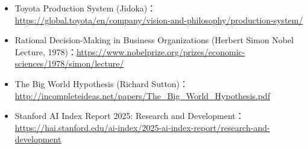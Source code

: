 \documentclass[UTF8,a4paper,11pt,fontset=fandol]{ctexart}
\begin{document}
\begin{itemize}
\item Toyota Production System (Jidoka)：\url{https://global.toyota/en/company/vision-and-philosophy/production-system/}

\item Rational Decision-Making in Business Organizations (Herbert Simon Nobel Lecture, 1978)：\url{https://www.nobelprize.org/prizes/economic-sciences/1978/simon/lecture/}

\item The Big World Hypothesis (Richard Sutton)：\url{http://incompleteideas.net/papers/The_Big_World_Hypothesis.pdf}

\item Stanford AI Index Report 2025: Research and Development：\url{https://hai.stanford.edu/ai-index/2025-ai-index-report/research-and-development}

\end{itemize}
\end{document}

